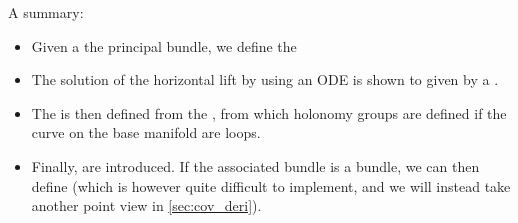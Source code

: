 \documentclass{article}
\begin{document}
A summary:
\begin{itemize}[$\blacktriangleright$]
\item Given a  the principal bundle, we define the  
\item The solution of the horizontal lift by using an ODE is shown to given by a .
\item The  is then defined from the , from which holonomy groups are defined if the curve on the base manifold are loops.
\item Finally,  are introduced. If the associated bundle is a  bundle, we can then define  (which is however quite difficult to implement, and we will instead take another point view in \cref{sec:cov_deri}).
\end{itemize}
\end{document}
